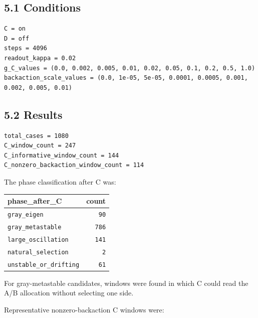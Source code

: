 \documentclass{article}
\newcounter{none}
\begin{document}
\subsection{5.1 Conditions}\label{conditions-1}

\begin{verbatim}
C = on
D = off
steps = 4096
readout_kappa = 0.02
g_C_values = (0.0, 0.002, 0.005, 0.01, 0.02, 0.05, 0.1, 0.2, 0.5, 1.0)
backaction_scale_values = (0.0, 1e-05, 5e-05, 0.0001, 0.0005, 0.001, 0.002, 0.005, 0.01)
\end{verbatim}

\subsection{5.2 Results}\label{results-1}

\begin{verbatim}
total_cases = 1080
C_window_count = 247
C_informative_window_count = 144
C_nonzero_backaction_window_count = 114
\end{verbatim}

The phase classification after C was:

{\def\LTcaptype{none} %
\begin{longtable}[]{@{}lr@{}}
\toprule\noalign{}
phase\_after\_C & count \\
\midrule\noalign{}
\endhead
\bottomrule\noalign{}
\endlastfoot
\texttt{gray\_eigen} & \texttt{90} \\
\texttt{gray\_metastable} & \texttt{786} \\
\texttt{large\_oscillation} & \texttt{141} \\
\texttt{natural\_selection} & \texttt{2} \\
\texttt{unstable\_or\_drifting} & \texttt{61} \\
\end{longtable}
}

For gray-metastable candidates, windows were found in which C could read
the A/B allocation without selecting one side.

Representative nonzero-backaction C windows were:
\end{document}
